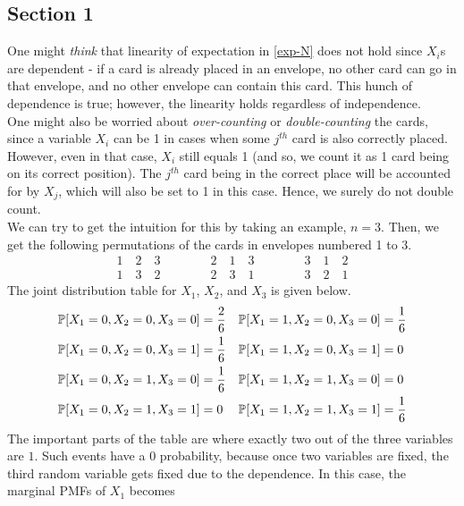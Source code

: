 \documentclass[9pt]{article}
\begin{document}
\subsection*{\textbf{Section 1}}
One might \textit{think} that linearity of expectation in \eqref{exp-N} does not hold since $X_{i}$s are dependent -
if a card is already placed in an envelope, no other card can go in that envelope, and no other envelope can contain this
card. This hunch of dependence is true; however, the linearity holds regardless of independence. \\
One might also be worried about \textit{over-counting} or \textit{double-counting} the cards, since a variable
$X_{i}$ can be 1 in cases when some $j^{th}$ card is also correctly placed. However, even in that case, $X_{i}$ still
equals 1 (and so, we count it as 1 card being on its correct position). The $j^{th}$ card being in the correct
place will be accounted for by $X_{j}$, which will also be set to 1 in this case.
Hence, we surely do not double count. \\
We can try to get the intuition for this by taking an example, $n = 3$. Then, we get the following
permutations of the cards in envelopes numbered 1 to 3.
\begin{align*}
    1 \quad 2 \quad 3 \qquad \qquad 2 \quad 1 \quad 3 \qquad \qquad 3 \quad 1 \quad 2 \\
    1 \quad 3 \quad 2 \qquad \qquad 2 \quad 3 \quad 1 \qquad \qquad 3 \quad 2 \quad 1
\end{align*}
The joint distribution table for $X_{1}$, $X_{2}$, and $X_{3}$ is given below.
\begin{align*}
    \mathbb{P}[X_{1} = 0, X_{2} = 0, X_{3} = 0] &= \frac{2}{6} &\hfill \mathbb{P}[X_{1} = 1, X_{2} = 0, X_{3} = 0] &= \frac{1}{6} \\
    \mathbb{P}[X_{1} = 0, X_{2} = 0, X_{3} = 1] &= \frac{1}{6} &\hfill \mathbb{P}[X_{1} = 1, X_{2} = 0, X_{3} = 1] &= 0 \\
    \mathbb{P}[X_{1} = 0, X_{2} = 1, X_{3} = 0] &= \frac{1}{6} &\hfill \mathbb{P}[X_{1} = 1, X_{2} = 1, X_{3} = 0] &= 0 \\
    \mathbb{P}[X_{1} = 0, X_{2} = 1, X_{3} = 1] &= 0 &\hfill \mathbb{P}[X_{1} = 1, X_{2} = 1, X_{3} = 1] &= \frac{1}{6}
\end{align*}
The important parts of the table are where exactly two out of the three variables are $1$. Such events have a $0$ probability,
because once two variables are fixed, the third random variable gets fixed due to the dependence. In this case,
the marginal PMFs of $X_{1}$ becomes
\end{document}

